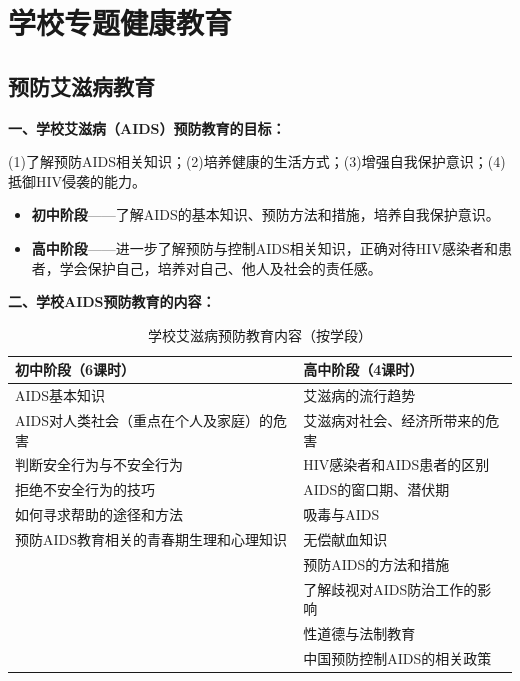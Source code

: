 \section{学校专题健康教育}

\subsection{预防艾滋病教育}

\begin{keybox}
\textbf{一、学校艾滋病（AIDS）预防教育的目标：}

(1)了解预防AIDS相关知识；(2)培养健康的生活方式；(3)增强自我保护意识；(4)抵御HIV侵袭的能力。

\begin{itemize}[leftmargin=*]
    \item \textbf{初中阶段}——了解AIDS的基本知识、预防方法和措施，培养自我保护意识。
    \item \textbf{高中阶段}——进一步了解预防与控制AIDS相关知识，正确对待HIV感染者和患者，学会保护自己，培养对自己、他人及社会的责任感。
\end{itemize}

\textbf{二、学校AIDS预防教育的内容：}

\begin{table}[H]
\centering
\caption{学校艾滋病预防教育内容（按学段）}
\small
\begin{tabularx}{\textwidth}{>{\raggedright\arraybackslash}p{5.5cm}>{\raggedright\arraybackslash}p{5.5cm}}
\hline
\textbf{初中阶段（6课时）} & \textbf{高中阶段（4课时）} \\
\hline
AIDS基本知识 & 艾滋病的流行趋势 \\
AIDS对人类社会（重点在个人及家庭）的危害 & 艾滋病对社会、经济所带来的危害 \\
判断安全行为与不安全行为 & HIV感染者和AIDS患者的区别 \\
拒绝不安全行为的技巧 & AIDS的窗口期、潜伏期 \\
如何寻求帮助的途径和方法 & 吸毒与AIDS \\
预防AIDS教育相关的青春期生理和心理知识 & 无偿献血知识 \\
 & 预防AIDS的方法和措施 \\
 & 了解歧视对AIDS防治工作的影响 \\
 & 性道德与法制教育 \\
 & 中国预防控制AIDS的相关政策 \\
\hline
\end{tabularx}
\end{table}
\end{keybox}

